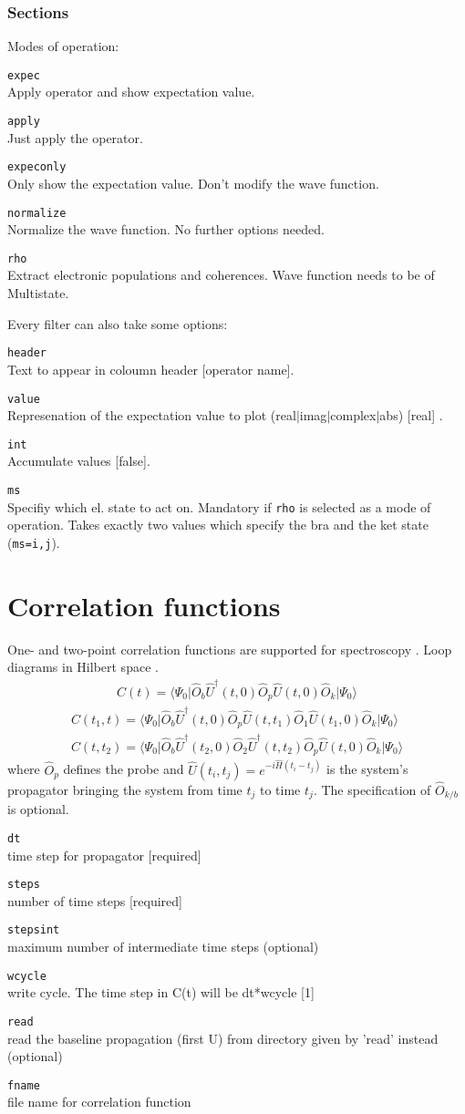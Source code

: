 \documentclass[a4paper,12pt]{scrbook}
\newcommand{\da}{^\dagger}
\newcommand{\br}[1]{\langle #1 \vert}
\newcommand{\ke}[1]{\vert #1  \rangle}
\newcommand{\option}[2]{\item \texttt{#1}\\ #2}
\newcommand{\code}[1]{\texttt{#1}}
\begin{document}
\subsubsection*{Sections}
Modes of operation:
\begin{options}
\option{expec}{Apply operator and show expectation value.}
\option{apply}{Just apply the operator.}
\option{expeconly}{Only show the expectation value. Don't modify the wave function.}
\option{normalize}{Normalize the wave function. No further options needed.}
\option{rho}{Extract electronic populations and coherences. Wave function needs to be of Multistate.}
\end{options}

Every filter can also take some options:
\begin{options}
\option{header}{Text to appear in coloumn header [operator name].}
\option{value}{Represenation of the expectation value to plot (real$|$imag$|$complex$|$abs) [real] .}
\option{int}{Accumulate values [false].}
\option{ms}{Specifiy which el. state to act on. Mandatory if \code{rho} is selected as a
mode of operation. Takes exactly two values which specify the bra and the ket state (\code{ms=i,j}).}
\end{options}


\section{Correlation functions}
One- and two-point correlation functions are supported for
spectroscopy \cite{Mukamel}. Loop diagrams in
Hilbert space \cite{Rahav10aamop}.
\begin{align}
C(t) = \br{\Psi_0}\hat O_b \hat U\da(t,0) \hat O_p \hat U(t,0) \hat O_k \ke{\Psi_0}
\end{align}
\begin{align}
C(t_1,t) = \br{\Psi_0}\hat O_b \hat U\da(t,0)
\hat O_p \hat U(t,t_1) \hat O_1 \hat U(t_1,0) \hat O_k \ke{\Psi_0}\\
C(t,t_2) = \br{\Psi_0}\hat O_b \hat U\da(t_2,0)
  \hat O_2 \hat U\da(t,t_2) \hat O_p \hat U(t,0) \hat O_k \ke{\Psi_0}
\end{align}
where $\hat O_p$ defines the probe and $\hat U(t_i,t_j)=e^{-i \hat H(t_i-t_j)}$
is the system's propagator bringing the system from time $t_j$ to time $t_j$.
The specification of $\hat O_{k/b}$ is optional.

\begin{options}
\option{dt}{time step for propagator [required]}
\option{steps}{number of time steps [required]}
\option{stepsint}{ maximum number of intermediate time steps (optional)}
\option{wcycle}{write cycle. The time step in C(t) will be dt*wcycle [1]}
\option{read}{read the baseline propagation (first U) from directory given by 'read' instead (optional)}
\option{fname}{file name for correlation function}
\end{options}
\end{document}
